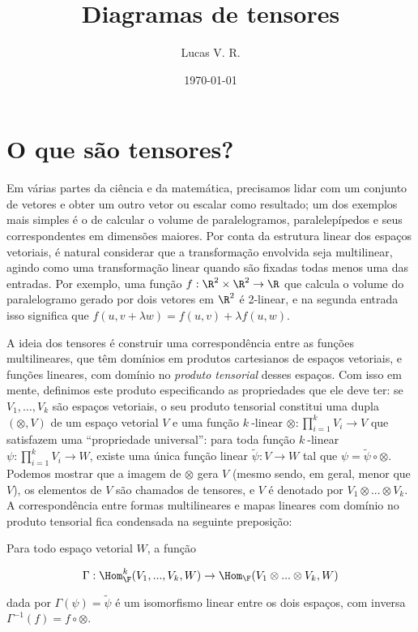\documentclass[11pt]{article}
\date{\today}
\title{Diagramas de tensores}
\author{Lucas V. R.}
\begin{document}
\maketitle


\section{O que são tensores?}
\label{sec:o-que-sao-tensores}
Em várias partes da ciência e da matemática, precisamos lidar com um conjunto de vetores e obter um outro vetor ou escalar como resultado; um dos exemplos mais simples é o de calcular o volume de paralelogramos, paralelepípedos e seus correspondentes em dimensões maiores. Por conta da estrutura linear dos espaços vetoriais, é natural considerar que a transformação envolvida seja multilinear, agindo como uma transformação linear quando são fixadas todas menos uma das entradas. Por exemplo, uma função \(f:\R^2\times\R^2\to\R\) que calcula o volume do paralelogramo gerado por dois vetores em \(\R^2\) é 2-linear, e na segunda entrada isso significa que \(f(u,v+\lambda w)=f(u,v)+\lambda f(u,w)\).

A ideia dos tensores é construir uma correspondência entre as funções multilineares, que têm domínios em produtos cartesianos de espaços vetoriais, e funções lineares, com domínio no \textit{produto tensorial} desses espaços. Com isso em mente, definimos este produto especificando as propriedades que ele deve ter: se \(V_1,\dots,V_k\) são espaços vetoriais, o seu produto tensorial constitui uma dupla \((\otimes,V)\) de um espaço vetorial \(V\) e uma função \(k~\)-linear \(\otimes:\prod_{i=1}^k V_i\to V\) que satisfazem uma ``propriedade universal'': para toda função \(k~\)-linear \(\psi:\prod_{i=1}^k V_i\to W\), existe uma única função linear \(\tilde\psi:V\to W\) tal que \(\psi=\tilde\psi\circ\otimes\). Podemos mostrar que a imagem de \(\otimes\) gera \(V\) (mesmo sendo, em geral, menor que \(V\)), os elementos de \(V\) são chamados de tensores, e \(V\) é denotado por \(V_1\otimes...\otimes V_k\). A correspondência entre formas multilineares e mapas lineares com domínio no produto tensorial fica condensada na seguinte preposição:

\begin{proposition}
Para todo espaço vetorial \(W\), a função

\begin{equation*}
  \Gamma:\Hom_{\F}^k(V_1,...,V_k, W)\to\Hom_{\F}(V_1\otimes...\otimes V_k,W)
\end{equation*}

dada por \(\Gamma(\psi)=\tilde\psi\) é um isomorfismo linear entre os dois espaços, com inversa \(\Gamma^{-1}(f)=f\circ\otimes\).\end{proposition}
\end{document}
